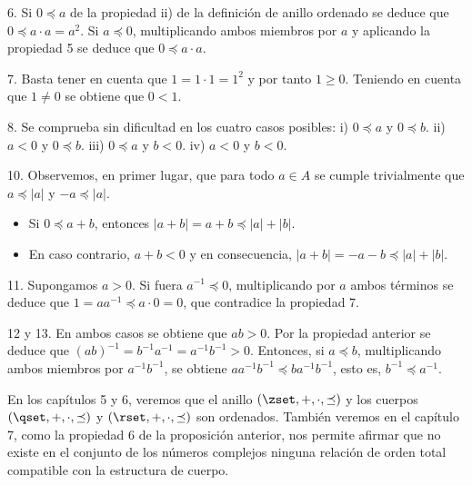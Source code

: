 6. Si $0 \preceq a$ de la propiedad ii) de la definición de anillo ordenado
se deduce que $0 \preceq a \cdot a = a^2$. Si $a \preceq 0$, multiplicando
ambos miembros por $a$ y aplicando la propiedad 5 se deduce que $0 \preceq a
\cdot a$.

7. Basta tener en cuenta que $1 = 1 \cdot 1 = 1^2$ y por tanto $1 \geq 0$.
Teniendo en cuenta que $1 \neq 0$ se obtiene que $0 < 1$.

8. Se comprueba sin dificultad en los cuatro casos posibles: i) $0 \preceq
a$ y $0 \preceq b$. ii) $a < 0$ y $0 \preceq b$. iii) $0 \preceq a$ y $b <
0$. iv) $a < 0$ y $b < 0$.

10. Observemos, en primer lugar, que para todo $a \in A$ se cumple
trivialmente que $a \preceq |a|$ y $-a \preceq |a|$.

\begin{itemize}
  \item Si $0 \preceq a + b$, entonces $|a + b| = a + b \preceq |a| + |b|$.
  \item En caso contrario, $a + b < 0$ y en consecuencia, $|a + b| = {-a} -
    b \preceq |a| + |b|$.
\end{itemize}

11. Supongamos $a > 0$. Si fuera $a^{-1} \preceq 0$, multiplicando por $a$
ambos términos se deduce que $1 = aa^{-1} \preceq a \cdot 0 = 0$, que
contradice la propiedad 7.

12 y 13. En ambos casos se obtiene que $ab > 0$. Por la propiedad anterior
se deduce que $(ab)^{-1} = b^{-1}a^{-1} = a^{-1}b^{-1} > 0$. Entonces, si $a
\preceq b$, multiplicando ambos miembros por $a^{-1}b^{-1}$, se obtiene
$aa^{-1}b^{-1} \preceq ba^{-1}b^{-1}$, esto es, $b^{-1} \preceq a^{-1}$.

En los capítulos 5 y 6, veremos que el anillo $(\zset, +, \cdot, \preceq)$ y
los cuerpos $(\qset, +, \cdot, \preceq)$ y $(\rset, +, \cdot, \preceq)$ son
ordenados. También veremos en el capítulo 7, como la propiedad 6 de la
proposición anterior, nos permite afirmar que no existe en el conjunto de
los números complejos ninguna relación de orden total compatible con la
estructura de cuerpo.







